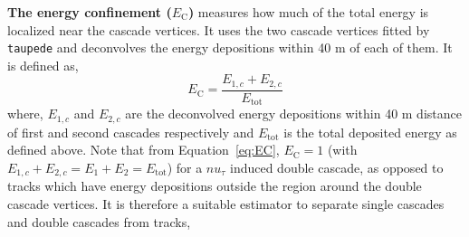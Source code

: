 \textbf{The energy confinement ($E_{\text{C}}$)} measures how much of the total energy is localized near the cascade vertices. It uses the two cascade vertices fitted by \texttt{taupede} and deconvolves the energy depositions within 40 m of each of them. It is defined as,
\begin{equation}\label{eq:EC}
    E_{\mathrm{C}} = \frac{E_{1,c}+E_{2,c}}{E_{\mathrm{tot}}}
\end{equation}
where, $E_{1,c}$ and $E_{2,c}$ are the deconvolved energy depositions within 40 m distance of first and second cascades respectively and $E_{\mathrm{tot}}$ is the total deposited energy as defined above. Note that from Equation~\ref{eq:EC}, $E_{\mathrm{C}}=1$ (with $E_{1,c}+E_{2,c}=E_1+E_2=E_{\mathrm{tot}}$) for a $nu_{\tau}$ induced double cascade, as opposed to tracks which have energy depositions outside the region around the double cascade vertices. It is therefore a suitable estimator to separate single cascades and double cascades from tracks,


